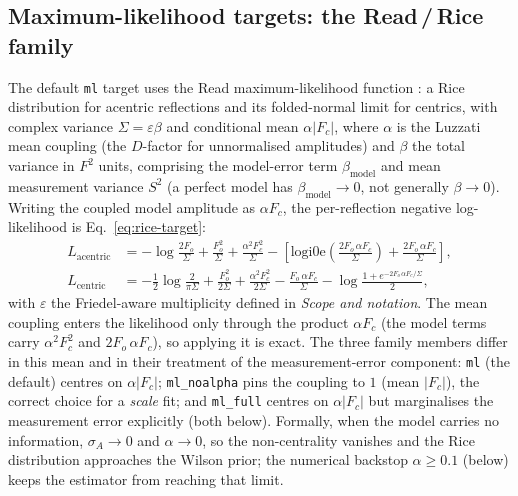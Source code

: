 \documentclass{iucrjournals}
\begin{document}
\subsection{Maximum-likelihood targets: the Read\,/\,Rice family}

The default \texttt{ml} target uses the Read maximum-likelihood function
\cite{read_improved_1986}: a Rice distribution for acentric reflections and its
folded-normal limit for centrics, with complex variance
$\Sigma = \varepsilon\beta$ and conditional mean $\alpha|F_{c}|$, where $\alpha$
is the Luzzati mean coupling (the $D$-factor for unnormalised amplitudes) and
$\beta$ the total variance in $F^{2}$ units, comprising the model-error term
$\beta_\mathrm{model}$ and mean measurement variance $S^2$ (a perfect model has
$\beta_\mathrm{model}\to0$, not generally $\beta\to0$). Writing the coupled
model amplitude as $\alpha F_{c}$, the
per-reflection negative log-likelihood is Eq.~\ref{eq:rice-target}:
%
\begin{align}
  L_\mathrm{acentric} &=
  -\log\frac{2F_{o}}{\Sigma} + \frac{F_{o}^{2}}{\Sigma}
  + \frac{\alpha^{2}F_{c}^{2}}{\Sigma}
  - \left[\mathrm{logi0e}\!\left(\frac{2F_{o}\,\alpha F_{c}}{\Sigma}\right)
  + \frac{2F_{o}\,\alpha F_{c}}{\Sigma}\right], \\
  L_\mathrm{centric} &=
  -\frac{1}{2}\log\frac{2}{\pi\Sigma} + \frac{F_{o}^{2}}{2\Sigma}
  + \frac{\alpha^{2}F_{c}^{2}}{2\Sigma} - \frac{F_{o}\,\alpha F_{c}}{\Sigma}
  - \log\frac{1 + e^{-2F_{o}\,\alpha F_{c}/\Sigma}}{2},
  \label{eq:rice-target}
\end{align}
%
with $\varepsilon$ the Friedel-aware multiplicity defined in \emph{Scope and
notation}.  The mean coupling enters the likelihood only through the product
$\alpha F_{c}$ (the model terms carry $\alpha^{2}F_{c}^{2}$ and
$2F_{o}\,\alpha F_{c}$), so applying it is exact.
The three family members differ in this mean and in their treatment of the
measurement-error component:
\texttt{ml} (the default) centres on $\alpha|F_{c}|$; \texttt{ml\_noalpha} pins
the coupling to $1$ (mean $|F_{c}|$), the correct choice for a \emph{scale} fit;
and \texttt{ml\_full} centres on $\alpha|F_{c}|$ but marginalises the measurement
error explicitly (both below). Formally, when the model carries no information,
$\sigma_{A}\!\to\!0$ and $\alpha\!\to\!0$, so the non-centrality vanishes and the
Rice distribution approaches the Wilson prior; the numerical backstop
$\alpha\geq0.1$ (below) keeps the estimator from reaching that limit.
\end{document}
